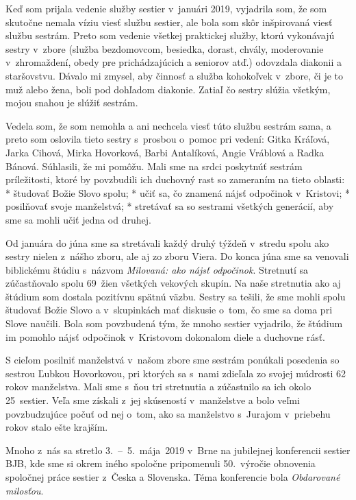 

Keď som prijala vedenie služby sestier v~januári 2019, vyjadrila som, že som skutočne nemala víziu viesť službu sestier, ale bola som skôr inšpirovaná viesť službu sestrám. Preto som vedenie všetkej praktickej služby, ktorú vykonávajú sestry v~zbore (služba bezdomovcom, besiedka, dorast, chvály, moderovanie v~zhromaždení, obedy pre prichádzajúcich a seniorov atď.) odovzdala diakonii a staršovstvu. Dávalo mi zmysel, aby činnosť a služba kohokoľvek v~zbore, či je to muž alebo žena, boli pod dohľadom diakonie. Zatiaľ čo sestry slúžia všetkým, mojou snahou je slúžiť sestrám.

Vedela som, že som nemohla a ani nechcela viesť túto službu sestrám sama, a preto som oslovila tieto sestry s~prosbou o~pomoc pri vedení: Gitka Kráľová, Jarka Cihová, Mirka Hovorková, Barbi Antalíková, Angie Vráblová a Radka Bánová. Súhlasili, že mi pomôžu. Mali sme na srdci poskytnúť sestrám príležitosti, ktoré by povzbudili ich duchovný rast so zameraním na tieto oblasti:
\begitems
* študovať Božie Slovo spolu;
* učiť sa, čo znamená nájsť odpočinok v~Kristovi;
* posilňovať svoje manželstvá;
* stretávať sa so sestrami všetkých generácií, aby sme sa mohli učiť jedna od druhej.
\enditems

Od januára do júna sme sa stretávali každý druhý týždeň v~stredu spolu ako sestry nielen z~nášho zboru, ale aj zo zboru Viera. Do konca júna sme sa venovali biblickému štúdiu s~názvom {\it Milovaná: ako nájsť odpočinok}. Stretnutí sa zúčastňovalo spolu 69~žien všetkých vekových skupín. Na naše stretnutia ako aj štúdium som dostala pozitívnu spätnú väzbu. Sestry sa tešili, že sme mohli spolu študovať Božie Slovo a v~skupinkách mať diskusie o~tom, čo sme sa doma pri Slove naučili. Bola som povzbudená tým, že mnoho sestier vyjadrilo, že štúdium im pomohlo nájsť odpočinok v~Kristovom dokonalom diele a duchovne rásť.

S cieľom posilniť manželstvá v~našom zbore sme sestrám ponúkali posedenia so sestrou Ľubkou Hovorkovou, pri ktorých sa s~nami zdieľala zo svojej múdrosti 62 rokov manželstva. Mali sme s~ňou tri stretnutia a zúčastnilo sa ich okolo 25~sestier. Veľa sme získali z~jej skúseností v~manželstve a bolo veľmi povzbudzujúce počuť od nej o~tom, ako sa manželstvo s~Jurajom v~priebehu rokov stalo ešte krajším.

Mnoho z~nás sa stretlo 3.~--~5.~mája~2019 v~Brne na jubilejnej konferencii sestier BJB, kde sme si okrem iného spoločne pripomenuli 50.~výročie obnovenia spoločnej práce sestier z~Česka a Slovenska. Téma konferencie bola {\it Obdarované milosťou}.

